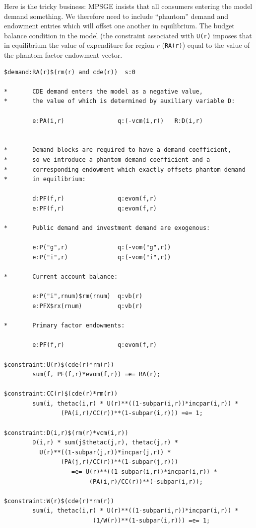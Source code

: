 Here is the tricky business: MPSGE insists that all consumers entering
the model demand something.  We therefore need to include ``phantom''
demand and endowment entries which will offset one another in
equilibrium.  The budget balance condition in the \CDE model (the
constraint associated with \texttt{U(r)} imposes that in equilibrium
the value of expenditure for region $r$ (\texttt{RA(r)}) equal to the
value of the phantom factor endowment vector.
\begin{Verbatim}
$demand:RA(r)$(rm(r) and cde(r))  s:0

*       CDE demand enters the model as a negative value, 
*       the value of which is determined by auxiliary variable D:

        e:PA(i,r)               q:(-vcm(i,r))   R:D(i,r)


*       Demand blocks are required to have a demand coefficient,
*       so we introduce a phantom demand coefficient and a
*       corresponding endowment which exactly offsets phantom demand
*       in equilibrium:

        d:PF(f,r)               q:evom(f,r)
        e:PF(f,r)               q:evom(f,r)

*       Public demand and investment demand are exogenous:

        e:P("g",r)              q:(-vom("g",r))
        e:P("i",r)              q:(-vom("i",r))

*       Current account balance:

        e:P("i",rnum)$rm(rnum)  q:vb(r)
        e:PFX$rx(rnum)          q:vb(r)

*       Primary factor endowments:

        e:PF(f,r)               q:evom(f,r)

$constraint:U(r)$(cde(r)*rm(r))
        sum(f, PF(f,r)*evom(f,r)) =e= RA(r);

$constraint:CC(r)$(cde(r)*rm(r))
        sum(i, thetac(i,r) * U(r)**((1-subpar(i,r))*incpar(i,r)) * 
                (PA(i,r)/CC(r))**(1-subpar(i,r))) =e= 1;

$constraint:D(i,r)$(rm(r)*vcm(i,r))
        D(i,r) * sum(j$thetac(j,r), thetac(j,r) * 
          U(r)**((1-subpar(j,r))*incpar(j,r)) * 
                (PA(j,r)/CC(r))**(1-subpar(j,r))) 
                   =e= U(r)**((1-subpar(i,r))*incpar(i,r)) *
                        (PA(i,r)/CC(r))**(-subpar(i,r));

$constraint:W(r)$(cde(r)*rm(r))
        sum(i, thetac(i,r) * U(r)**((1-subpar(i,r))*incpar(i,r)) * 
                         (1/W(r))**(1-subpar(i,r))) =e= 1;
\end{Verbatim}
